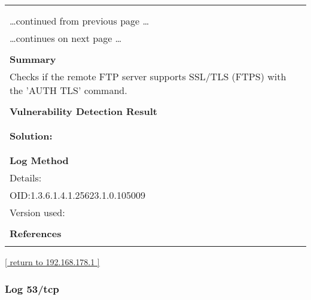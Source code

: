 \documentclass{article}
\begin{document}
\begin{longtable}{|p{}|}
\hline
\rowcolor{gvm_log}{\color{white}{Log (CVSS: 0.0) }}\\
\rowcolor{gvm_log}{\color{white}{NVT: SSL/TLS: FTP 'AUTH TLS' Command Detection}}\\
\hline
\endfirsthead
\hfill\ldots continued from previous page \ldots \\
\hline
\endhead
\hline
\ldots continues on next page \ldots \\
\endfoot
\hline
\endlastfoot
\\
\textbf{Summary}\\
Checks if the remote FTP server supports SSL/TLS (FTPS) with the 'AUTH TLS' command.\\

        \hline
        \\
\textbf{Vulnerability Detection Result}\\
\rowcolor{white}{\verb=The remote FTP server supports TLS (FTPS) with the 'AUTH TLS' command.=}\\

          \hline
          \\
\textbf{Solution:}\\
\\


        \hline
        \\
\textbf{Log Method}\\
Details:
\rowcolor{white}{\verb=SSL/TLS: FTP 'AUTH TLS' Command Detection=}\\
OID:1.3.6.1.4.1.25623.1.0.105009\\
Version used:
\rowcolor{white}{\verb=2020-08-24T08:40:10Z=}\\

      \hline
      \\
\textbf{References}\\
\rowcolor{white}{\verb=url: https://tools.ietf.org/html/rfc4217=}\\
\end{longtable}

\begin{footnotesize}\hyperref[host:192.168.178.1]{[ return to 192.168.178.1 ]}\end{footnotesize}
\subsubsection{Log 53/tcp}
\label{port:192.168.178.1 53/tcp Log}
\end{document}
